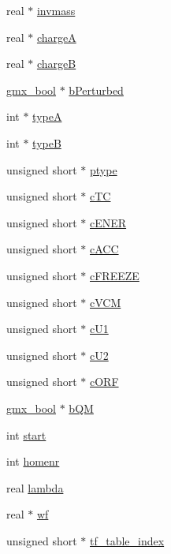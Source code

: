 \begin{DoxyCompactItemize}
\item 
real $\ast$ \hyperlink{structt__mdatoms_adbe963b5d20a1f4b4f6a681e8abb30f4}{invmass}
\item 
real $\ast$ \hyperlink{structt__mdatoms_acbddfb23c1fa759efa8b72b8635f86b5}{charge\-A}
\item 
real $\ast$ \hyperlink{structt__mdatoms_ada1323d399a2eedd448621a51e4fc464}{charge\-B}
\item 
\hyperlink{include_2types_2simple_8h_a8fddad319f226e856400d190198d5151}{gmx\-\_\-bool} $\ast$ \hyperlink{structt__mdatoms_a5798d6b7b373cce9d51b0016950164fd}{b\-Perturbed}
\item 
int $\ast$ \hyperlink{structt__mdatoms_ac340e40d81d520d55adef7758aa73dc2}{type\-A}
\item 
int $\ast$ \hyperlink{structt__mdatoms_a1566a9153eb9b12b005a530535d0da95}{type\-B}
\item 
unsigned short $\ast$ \hyperlink{structt__mdatoms_a2e5173f055f8fef9b2e2126dbad933e6}{ptype}
\item 
unsigned short $\ast$ \hyperlink{structt__mdatoms_aab89048845a0a53c6a811a6b23e075b0}{c\-T\-C}
\item 
unsigned short $\ast$ \hyperlink{structt__mdatoms_a245ff83d78aca61035b637ebfe369751}{c\-E\-N\-E\-R}
\item 
unsigned short $\ast$ \hyperlink{structt__mdatoms_a2e1dcb6a2ee6dde005d26390102187ab}{c\-A\-C\-C}
\item 
unsigned short $\ast$ \hyperlink{structt__mdatoms_a0d812507b9e597a940868c13157ae968}{c\-F\-R\-E\-E\-Z\-E}
\item 
unsigned short $\ast$ \hyperlink{structt__mdatoms_a46cbadf782fdfc8d3e02b91fba5153fe}{c\-V\-C\-M}
\item 
unsigned short $\ast$ \hyperlink{structt__mdatoms_aad5d6f252b9fa1544c01dc5c8d5ce9c3}{c\-U1}
\item 
unsigned short $\ast$ \hyperlink{structt__mdatoms_abd5e42ed0fc957f649f905dc760ba60a}{c\-U2}
\item 
unsigned short $\ast$ \hyperlink{structt__mdatoms_a3c42ad11b045815aaf3e4197f9270463}{c\-O\-R\-F}
\item 
\hyperlink{include_2types_2simple_8h_a8fddad319f226e856400d190198d5151}{gmx\-\_\-bool} $\ast$ \hyperlink{structt__mdatoms_a0f8192a96497dc3df4c43d754ff6653d}{b\-Q\-M}
\item 
int \hyperlink{structt__mdatoms_a02b57640dcc1bc6affb502d7b27cfe0d}{start}
\item 
int \hyperlink{structt__mdatoms_a332cdfd7ca6a37510e80379bc2a58a28}{homenr}
\item 
real \hyperlink{structt__mdatoms_a7604795aee9d4ee5ec83ad7b839ccc2b}{lambda}
\item 
real $\ast$ \hyperlink{structt__mdatoms_a0756cb6a32cf79b4b2714241aa82ac24}{wf}
\item 
unsigned short $\ast$ \hyperlink{structt__mdatoms_a0407ae92f037b9703414394b7cea6189}{tf\-\_\-table\-\_\-index}
\end{DoxyCompactItemize}


